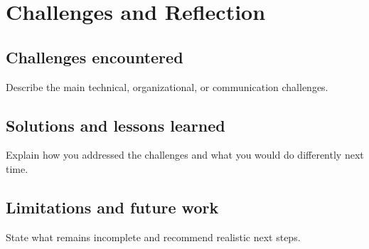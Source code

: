 \chapter{Challenges and Reflection}
\section{Challenges encountered}
Describe the main technical, organizational, or communication challenges.

\section{Solutions and lessons learned}
Explain how you addressed the challenges and what you would do differently next time.

\section{Limitations and future work}
State what remains incomplete and recommend realistic next steps.
